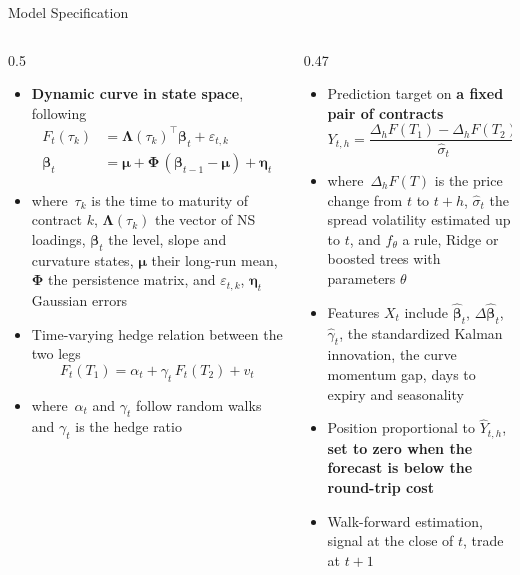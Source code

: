\documentclass[10pt, aspectratio=169]{beamer}
\newcommand{\where}{{\footnotesize\color{slate}where}}
\newcommand{\key}[1]{\textcolor{accent}{\textbf{#1}}}
\begin{document}
\begin{frame}{Model Specification}
\begin{columns}[T, onlytextwidth]
\begin{column}{0.5\textwidth}
\footnotesize
\begin{itemize}
  \item \key{Dynamic curve in state space}, following \textcite{diebold2006forecasting}
  \begin{align*}
    F_t(\tau_k) &= \bm\Lambda(\tau_k)^{\top}\bm\beta_t + \varepsilon_{t,k}\\
    \bm\beta_t &= \bm\mu + \bm\Phi\,(\bm\beta_{t-1}-\bm\mu) + \bm\eta_t
  \end{align*}
  \item \where\ $\tau_k$ is the time to maturity of contract $k$, $\bm\Lambda(\tau_k)$ the
        vector of NS loadings, $\bm\beta_t$ the level, slope and curvature states,
        $\bm\mu$ their long-run mean, $\bm\Phi$ the persistence matrix, and
        $\varepsilon_{t,k}$, $\bm\eta_t$ Gaussian errors
  \item Time-varying hedge relation between the two legs
  \[
    F_t(T_1) = \alpha_t + \gamma_t\,F_t(T_2) + v_t
  \]
  \item \where\ $\alpha_t$ and $\gamma_t$ follow random walks and $\gamma_t$ is the hedge ratio
\end{itemize}
\end{column}
\begin{column}{0.47\textwidth}
\footnotesize
\begin{itemize}
  \item Prediction target on \key{a fixed pair of contracts}
  \[
    Y_{t,h} = \frac{\Delta_h F(T_1) - \Delta_h F(T_2)}{\hat\sigma_t}, \qquad \hat Y_{t,h} = f_{\theta}(X_t)
  \]
  \item \where\ $\Delta_h F(T)$ is the price change from $t$ to $t+h$, $\hat\sigma_t$ the
        spread volatility estimated up to $t$, and $f_\theta$ a rule, Ridge or boosted trees with parameters $\theta$
  \item Features $X_t$ include $\hat{\bm\beta}_t$, $\Delta\hat{\bm\beta}_t$, $\hat\gamma_t$, the
        standardized Kalman innovation, the curve momentum gap, days to expiry and seasonality
  \item Position proportional to $\hat Y_{t,h}$, \key{set to zero when the forecast is below the
        round-trip cost}
  \item Walk-forward estimation, signal at the close of $t$, trade at $t+1$
\end{itemize}
\end{column}
\end{columns}
\end{frame}
\end{document}
